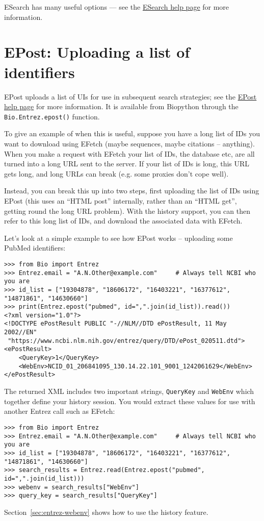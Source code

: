ESearch has many useful options --- see the \href{https://www.ncbi.nlm.nih.gov/books/NBK25499/#chapter4.ESearch}{ESearch help page} for more information.

\section{EPost: Uploading a list of identifiers}
EPost uploads a list of UIs for use in subsequent search strategies; see the
\href{https://www.ncbi.nlm.nih.gov/books/NBK25499/#chapter4.EPost}{EPost help page} for more information. It is available from Biopython through
the \verb+Bio.Entrez.epost()+ function.

To give an example of when this is useful, suppose you have a long list of IDs
you want to download using EFetch (maybe sequences, maybe citations --
anything). When you make a  request with EFetch your list of IDs, the database
etc, are all turned into a long URL sent to the server.  If your list of IDs is
long, this URL gets long, and long URLs can break (e.g. some proxies don't
cope well).

Instead, you can break this up into two steps, first uploading the list of IDs
using EPost (this uses an ``HTML post'' internally, rather than an ``HTML get'',
getting round the long URL problem).  With the history support, you can then
refer to this long list of IDs, and download the associated data with EFetch.

Let's look at a simple example to see how EPost works -- uploading some PubMed identifiers:
\begin{verbatim}
>>> from Bio import Entrez
>>> Entrez.email = "A.N.Other@example.com"     # Always tell NCBI who you are
>>> id_list = ["19304878", "18606172", "16403221", "16377612", "14871861", "14630660"]
>>> print(Entrez.epost("pubmed", id=",".join(id_list)).read())
<?xml version="1.0"?>
<!DOCTYPE ePostResult PUBLIC "-//NLM//DTD ePostResult, 11 May 2002//EN"
 "https://www.ncbi.nlm.nih.gov/entrez/query/DTD/ePost_020511.dtd">
<ePostResult>
	<QueryKey>1</QueryKey>
	<WebEnv>NCID_01_206841095_130.14.22.101_9001_1242061629</WebEnv>
</ePostResult>
\end{verbatim}
\noindent The returned XML includes two important strings, \verb|QueryKey| and \verb|WebEnv| which together define your history session.
You would extract these values for use with another Entrez call such as EFetch:

\begin{verbatim}
>>> from Bio import Entrez
>>> Entrez.email = "A.N.Other@example.com"     # Always tell NCBI who you are
>>> id_list = ["19304878", "18606172", "16403221", "16377612", "14871861", "14630660"]
>>> search_results = Entrez.read(Entrez.epost("pubmed", id=",".join(id_list)))
>>> webenv = search_results["WebEnv"]
>>> query_key = search_results["QueryKey"]
\end{verbatim}
\noindent Section~\ref{sec:entrez-webenv} shows how to use the history feature.

